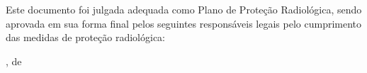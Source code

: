 


\begin{folhadeaprovacao}

    \begin{center}{\large \instituicao}\end{center}
    
    Este documento foi julgada adequada como Plano de Proteção Radiológica, sendo aprovada em sua forma final pelos seguintes responsáveis legais pelo cumprimento das medidas de proteção radiológica:
    
        \vfill
        \vfill

        \vspace{1.5cm}
    
        \begin{center}\large \local, \mes \hspace{1pt} de \ano\end{center}
  
\end{folhadeaprovacao}